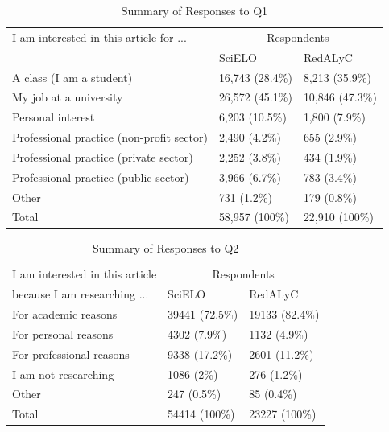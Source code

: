\begin{table}[!htbp]
\centering
\caption{Summary of Responses to Q1} \label{q1_summary}
\begin{tabular}{@{}lll@{}}
\toprule
I am interested in this article for ... &\multicolumn{2}{c}{Respondents} \\ \cmidrule{2-3}
    &   SciELO  &   RedALyC \\ \midrule
A class (I am a student)                    &   16,743 (28.4\%) &   8,213 (35.9\%) \\
My job at a university                      &   26,572 (45.1\%) &   10,846 (47.3\%) \\
Personal interest                           &   6,203 (10.5\%)  &   1,800 (7.9\%) \\
Professional practice (non-profit sector)   &   2,490 (4.2\%)   &   655 (2.9\%) \\
Professional practice (private sector)      &   2,252 (3.8\%)   &   434 (1.9\%) \\
Professional practice (public sector)       &   3,966 (6.7\%)   &   783 (3.4\%) \\
Other                                       &   731 (1.2\%)     &   179 (0.8\%) \\ \midrule
Total                                       &   58,957 (100\%)  &   22,910 (100\%)  \\ \bottomrule
\end{tabular}
\end{table}


\begin{table}[!htbp]
\centering
\caption{Summary of Responses to Q2} \label{q2_summary}
\begin{tabular}{@{}lll@{}}
\toprule
I am interested in this article     &\multicolumn{2}{c}{Respondents} \\ \cmidrule{2-3}
because I am researching ...   &   SciELO  &   RedALyC \\ \midrule
For academic reasons    &   39441 (72.5\%)   &   19133 (82.4\%)   \\
For personal reasons    &   4302 (7.9\%) &   1132 (4.9\%) \\
For professional reasons    &   9338 (17.2\%)    &   2601 (11.2\%)    \\
I am not researching    &   1086 (2\%)   &   276 (1.2\%)  \\
Other   &   247 (0.5\%)  &   85 (0.4\%)   \\ \midrule
Total   &   54414 (100\%)    &   23227 (100\%)    \\ \bottomrule
\end{tabular}
\end{table}


